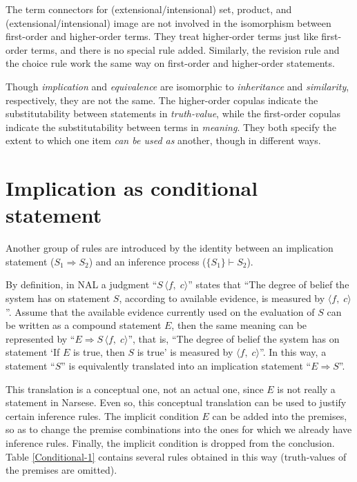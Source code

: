 The term connectors for (extensional/intensional) set, product, and (extensional/intensional) image are not involved in the isomorphism between first-order and higher-order terms.  They treat higher-order terms just like first-order terms, and there is no special rule added. Similarly, the revision rule and the choice rule work the same way on first-order and higher-order statements.

Though \emph{implication} and \emph{equivalence} are isomorphic to \emph{inheritance} and \emph{similarity}, respectively, they are not the same. The higher-order copulas indicate the substitutability between statements in \emph{truth-value}, while the first-order copulas indicate the substitutability between terms in \emph{meaning}. They both specify the extent to which one item \emph{can be used as} another, though in different ways.


\section{Implication as conditional statement}

Another group of rules are introduced by the identity between an implication statement (\(S_1 \Rightarrow S_2\)) and an inference process (\(\{S_1\} \vdash S_2\)).

By definition, in NAL a judgment ``\(S \, \langle f, \; c \rangle \)'' states that ``The degree of belief the system has on statement $S$, according to available evidence, is measured by \(\langle  f, \; c \rangle \)''.  Assume that the available evidence currently used on the evaluation of $S$ can be written as a compound statement $E$, then the same meaning can be represented by ``\(E \Rightarrow S \, \langle  f, \; c \rangle \)'', that is, ``The degree of belief the system has on statement `If $E$ is true, then $S$ is true' is measured by \(\langle  f, \; c \rangle \)''.  In this way, a statement ``$S$'' is equivalently translated into an implication statement ``\(E \Rightarrow S\)''.

This translation is a conceptual one, not an actual one, since $E$ is not really a statement in Narsese. Even so, this conceptual translation can be used to justify certain inference rules.  The implicit condition $E$ can be added into the premises, so as to change the premise combinations into the ones for which we already have inference rules.  Finally, the implicit condition is dropped from the conclusion. Table \ref{Conditional-1} contains several rules obtained in this way (truth-values of the premises are omitted).

